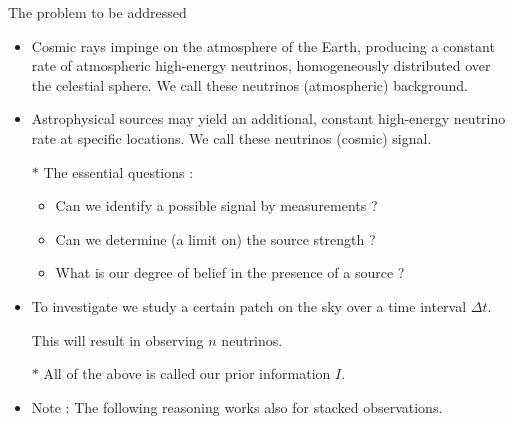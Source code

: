 \onecolumn
\begin{center}
{\red The problem to be addressed} 
\end{center}
\begin{itemize}
\item Cosmic rays impinge on the atmosphere of the Earth, producing a constant rate
      of atmospheric high-energy neutrinos, homogeneously distributed over the celestial sphere.
      We call these neutrinos (atmospheric) background.
\item Astrophysical sources may yield an additional, constant high-energy neutrino rate at specific locations.
      We call these neutrinos (cosmic) signal.
\item[$\ast$] {\blue The essential questions :}
\begin{itemize}
\item Can we identify a possible signal by measurements ?
\item Can we determine (a limit on) the source strength ?
\item What is our degree of belief in the presence of a source ?
\end{itemize}
\item To investigate we study a certain patch on the sky over a time interval $\Delta t$.
\item[] This will result in observing $n$ neutrinos.
\item[$\ast$] All of the above is called our {\blue prior information $I$}.
\item Note : {\red The following reasoning works also for stacked observations.}
\end{itemize}

